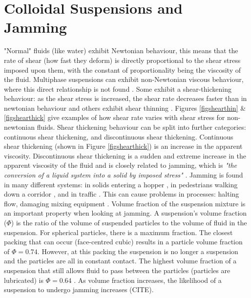 \documentclass[a4]{report}
\begin{document}
	\section{Colloidal Suspensions and Jamming}
	"Normal" fluids (like water) exhibit Newtonian behaviour, this means that the rate of shear (how fast they deform) is directly proportional to the shear stress imposed upon them, with the constant of proportionality being the viscosity of the fluid\cite[p.~252]{schadict}. Multiphase suspensions can exhibit non-Newtonian viscous behaviour, where this direct relationship is not found \cite[p.~255-256]{schadict}. Some exhibit a shear-thickening behaviour: as the shear stress is increased, the shear rate decreases faster than in newtonian behaviour and others exhibit shear thinning \cite{backtypesofnonnewt}. Figures \ref{figshearthin} \& \ref{figshearthick} give examples of how shear rate varies with shear stress for non-newtonian fluids. Shear thickening behaviour can be split into further categories: continuous shear thickening, and discontinuous shear thickening. Continuous shear thickening (shown in Figure \ref{figshearthick})  is an increase in the apparent viscosity. Discontinuous shear thickening is a sudden and extreme increase in the apparent viscosity of the fluid and is closely related to jamming, which is \textit{"the conversion of a liquid system into a solid by imposed stress"} \cite{backhawjam}. Jamming is found in many different systems: in solids entering a hopper \cite{back2djam}, in pedestrians walking down a corridor \cite{backpedjam}, and in traffic \cite{backcarjam}. This can cause problems in processes: halting flow, damaging mixing equipment \cite{backshearjambertrand}. \newline \newline \noindent
	Volume fraction of the suspension mixture is an important property when looking at jamming. A suspension's volume fraction (\( \Phi \)) is the ratio of the volume of suspended particles to the volume of fluid in the suspension. For spherical particles, there is a maximum fraction. The closest packing that can occur (face-centred cubic) results in a particle volume fraction of \( \Phi = 0.74 \). However, at this packing the suspension is no longer a suspension and the particles are all in constant contact. The highest volume fraction of a suspension that still allows fluid to pass between the particles (particles are lubricated) is \( \Phi = 0.64 \) \cite{backguypoonjam}. As volume fraction increases, the likelihood of a suspension to undergo jamming increases (CITE).
\end{document}
